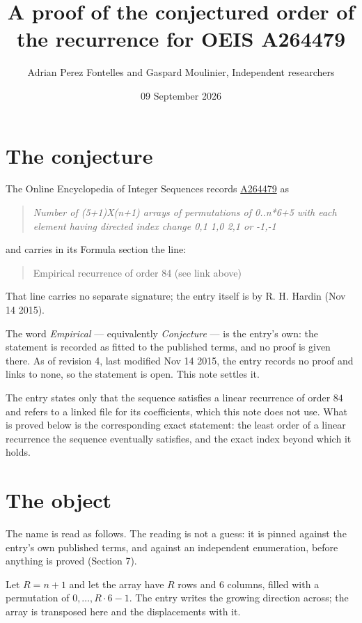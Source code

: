 \documentclass[11pt]{article}
\title{A proof of the conjectured order of the recurrence for OEIS A264479}
\author{Adrian Perez Fontelles and Gaspard Moulinier, Independent researchers}
\date{09 September 2026}
\theoremstyle{definition}
\begin{document}
\maketitle
\section{The conjecture}

The Online Encyclopedia of Integer Sequences records \href{https://oeis.org/A264479}{A264479} as

\begin{quote}\itshape Number of (5+1)X(n+1) arrays of permutations of 0..n*6+5 with each element having directed index change 0,1 1,0 2,1 or -1,-1\end{quote}

and carries in its Formula section the line:

\begin{quote}\ttfamily Empirical recurrence of order 84 (see link above)\end{quote}

That line carries no separate signature; the entry itself is by R. H. Hardin (Nov 14 2015).

The word {\itshape Empirical} --- equivalently {\itshape Conjecture} --- is the entry's own: the statement is recorded as fitted to the published terms, and no proof is given there. As of revision 4, last modified Nov 14 2015, the entry records no proof and links to none, so the statement is open. This note settles it.

The entry states only that the sequence satisfies a linear recurrence of order $84$ and refers to a linked file for its coefficients, which this note does not use. What is proved below is the corresponding exact statement: the least order of a linear recurrence the sequence eventually satisfies, and the exact index beyond which it holds.

\section{The object}

The name is read as follows. The reading is not a guess: it is pinned against the entry's own published terms, and against an independent enumeration, before anything is proved (Section 7).

Let $R = n + 1$ and let the array have $R$ rows and $6$ columns, filled with a permutation of $0,\dots,R\cdot6-1$. The entry writes the growing direction across; the array is transposed here and the displacements with it.
\end{document}
